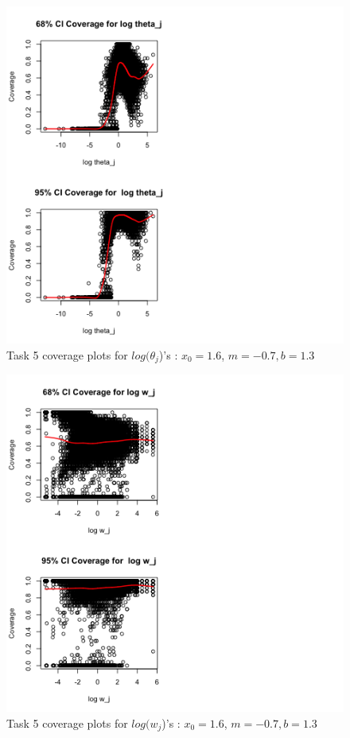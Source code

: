 \documentclass[paper=a4, fontsize=11pt]{scrartcl}
\begin{document}
\begin{figure}[h!]
  \caption{Task 5 coverage plots for $log(\theta_{j}$)'s : $x_0 = 1.6$, $m = -0.7, b = 1.3$}
  \centering
	\includegraphics[scale=1, trim = 0 0 200 0]{keskici_wxiao_ps2_task5_plot3.png}
\end{figure}

\begin{figure}[h!]
  \caption{Task 5 coverage plots for $log(w_{j}$)'s : $x_0 = 1.6$, $m = -0.7, b = 1.3$}
  \centering
	\includegraphics[scale=1, trim = 0 0 200 0]{keskici_wxiao_ps2_task5_plot4.png}
\end{figure}
\end{document}

